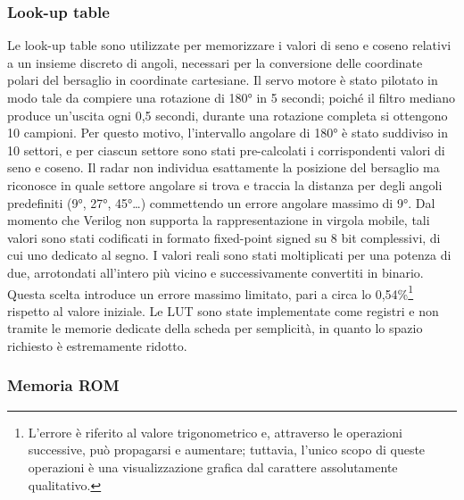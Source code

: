 \documentclass[reprint,amsmath,amssymb,aps,rmp,twoside]{revtex4-2}
\begin{document}
\subsubsection{Look-up table}

Le look-up table sono utilizzate per memorizzare i valori di seno e coseno relativi a un insieme discreto di angoli, necessari per la conversione delle coordinate polari del bersaglio in coordinate cartesiane. Il servo motore è stato pilotato in modo tale da compiere una rotazione di 180° in 5 secondi; poiché il filtro mediano produce un’uscita ogni 0,5 secondi, durante una rotazione completa si ottengono 10 campioni. Per questo motivo, l’intervallo angolare di 180° è stato suddiviso in 10 settori, e per ciascun settore sono stati pre-calcolati i corrispondenti valori di seno e coseno. Il radar non individua esattamente la posizione del bersaglio ma riconosce in quale settore angolare si trova e traccia la distanza per degli angoli predefiniti (9°, 27°, 45°…) commettendo un errore angolare massimo di 9°. Dal momento che Verilog non supporta la rappresentazione in virgola mobile, tali valori sono stati codificati in formato fixed-point signed su 8 bit complessivi, di cui uno dedicato al segno. I valori reali sono stati moltiplicati per una potenza di due, arrotondati all’intero più vicino e successivamente convertiti in binario. Questa scelta introduce un errore massimo limitato, pari a circa lo 0,54\%\footnote{L’errore è riferito al valore trigonometrico e, attraverso le operazioni successive, può propagarsi e aumentare; tuttavia, l'unico scopo di queste operazioni è una visualizzazione grafica dal carattere assolutamente qualitativo.} rispetto al valore iniziale. Le LUT sono state implementate come registri e non tramite le memorie dedicate della scheda per semplicità, in
quanto lo spazio richiesto è estremamente ridotto.



\subsubsection{Memoria ROM}
\end{document}
